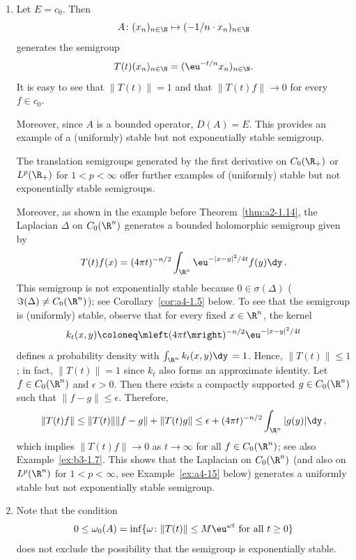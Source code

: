 \begin{example}\label{ex:a4-1.2}
\begin{enumerate}[\upshape (i), wide, labelindent=.25em]

\item 
Let $E = c_{0}$. 
Then 
\[
A \colon (x_{n})_{n \in \N} \mapsto (-1/n \cdot x_{n})_{n \in \N}
\] 
generates the semigroup 
\[
T(t)(x_{n})_{n \in \N} = (\eu^{-t/n} x_{n})_{n \in \N}.
\]
It is easy to see that $\|T(t)\|=1$ and that $\|T(t)f\|\to 0$ for every $f \in c_{0}$.

Moreover, since $A$ is a bounded operator, $D(A) = E$.
This provides an example of a (uniformly) stable but not exponentially stable semigroup.

The translation semigroups generated by the first derivative on $C_0(\R_{+})$ or $L^{p}(\R_{+})$ for $1 < p < \infty$ offer further examples of (uniformly) stable but not exponentially stable semigroups.

Moreover, as shown in the example before Theorem~\ref{thm:a2-1.14},
the Laplacian $\Delta$ on $C_0(\R^{n})$ generates a bounded holomorphic semigroup given by 
\[
T(t)f(x) = (4\pi t)^{-n/2} \int_{\R^{n}} \eu^{-|x-y|^{2}/4t} f(y)  \dy\,.
\]
This semigroup is not exponentially stable because $0 \in \sigma(\Delta)$ ($\Im(\Delta) \not= C_0(\R^{n})$); see Corollary~\ref{cor:a4-1.5} below. To see that the semigroup is (uniformly) stable, observe that for every fixed $x\in\R^n$, the kernel 
%
\[
	k_t(x,y) \coloneq  \mleft(4\pi t\mright)^{-n/2} \eu^{-|x-y|^{2}/4t}
\]
%
defines a probability density with $\int_{\R^n} k_t(x,y) \dy\, = 1$. Hence, $\|T(t)\| \le 1$; in fact, $\|T(t)\| = 1$ since $k_t$ also forms an approximate identity. Let $f \in C_0(\R^{n})$ and $\epsilon > 0$. Then there exists a compactly supported $g \in C_0(\R^{n})$ such that $\|f-g\| \le \epsilon$. Therefore,
\[
\|T(t)f\| \le  \|T(t)\|\|f-g\| + \|T(t)g\| \le \epsilon + (4\pi t)^{-n/2} \int_{\R^{n}} |g(y)|  \dy\, ,
\]
which implies  $\|T(t)f\| \to 0$ as $t\to\infty$ for all $f \in C_0(\R^{n})$; see also Example~\ref{ex:b3-1.7}.
This shows that the Laplacian on $C_0(\R^{n})$ (and also on $L^{p}(\R^{n})$ for $1 < p < \infty$, see 
Example~\ref{ex:a4-15} below) generates a uniformly stable but not exponentially stable semigroup.

\item 
Note that the condition 
\[
0 \leq \omega_{0}(A) = \inf\{\omega\colon\|T(t)\| \leq M\eu^{\omega t} \text{ for all } t \geq 0\}
\]
does not exclude the possibility that the semigroup is exponentially stable.


\end{enumerate}
\end{example}
